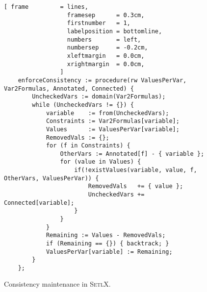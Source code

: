 \begin{figure}[!ht]
\centering
\begin{Verbatim}[ frame         = lines, 
                  framesep      = 0.3cm, 
                  firstnumber   = 1,
                  labelposition = bottomline,
                  numbers       = left,
                  numbersep     = -0.2cm,
                  xleftmargin   = 0.0cm,
                  xrightmargin  = 0.0cm,
                ]
    enforceConsistency := procedure(rw ValuesPerVar, Var2Formulas, Annotated, Connected) {
        UncheckedVars := domain(Var2Formulas);
        while (UncheckedVars != {}) {
            variable    := from(UncheckedVars);
            Constraints := Var2Formulas[variable];
            Values      := ValuesPerVar[variable];
            RemovedVals := {};
            for (f in Constraints) {
                OtherVars := Annotated[f] - { variable };
                for (value in Values) {
                    if(!existValues(variable, value, f, OtherVars, ValuesPerVar)) {
                        RemovedVals   += { value };
                        UncheckedVars += Connected[variable];
                    }
                }
            }
            Remaining := Values - RemovedVals;
            if (Remaining == {}) { backtrack; }
            ValuesPerVar[variable] := Remaining;
        }
    };
\end{Verbatim}
\vspace*{-0.3cm}
\caption{Consistency maintenance in \textsc{SetlX}.}
\label{fig:csp-consistency.stlx:enforceConsistency}
\end{figure}

